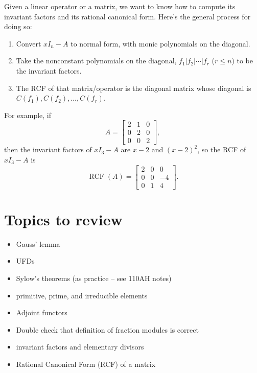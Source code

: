 \documentclass[12pt]{article}
\begin{document}
\par
Given a linear operator or a matrix, we want to know how to compute its invariant factors and its rational canonical form. Here's the general process for doing so:
\begin{enumerate}
    \item Convert $xI_n-A$ to normal form, with monic polynomials on the diagonal.
    \item Take the nonconstant polynomials on the diagonal, $f_1|f_2|\cdots |f_r$ ($r \leq n$) to be the invariant factors.
    \item The RCF of that matrix/operator is the diagonal matrix whose diagonal is $C(f_1), C(f_2), \dots, C(f_r)$.
\end{enumerate}
For example, if
\[ A = \begin{bmatrix}
    2 & 1 & 0 \\
    0 & 2 & 0 \\
    0 & 0 & 2
\end{bmatrix}, \]
then the invariant factors of $xI_3-A$ are $x-2$ and $(x-2)^2$, so the RCF of $xI_3-A$ is
\[ \operatorname{RCF}(A)= \begin{bmatrix}
    2 & 0 & 0 \\
    0 & 0 & -4 \\
    0 & 1 & 4
\end{bmatrix}. \]

\section{Topics to review}
\begin{itemize}
    \item Gauss' lemma
    \item UFDs
    \item Sylow's theorems (as practice -- see 110AH notes)
    \item primitive, prime, and irreducible elements
    \item Adjoint functors
    \item Double check that definition of fraction modules is correct
    \item invariant factors and elementary divisors
    \item Rational Canonical Form (RCF) of a matrix
\end{itemize}
\end{document}
